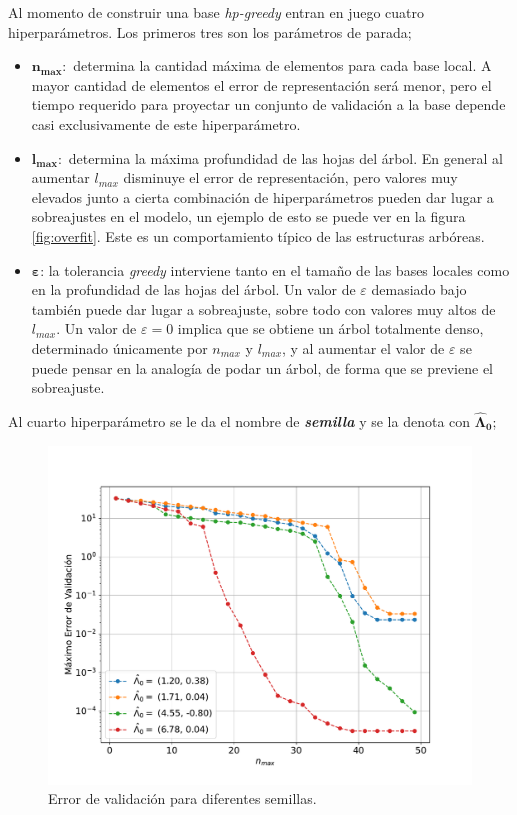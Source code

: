 Al momento de construir una base \textit{hp-greedy} entran en juego cuatro hiperparámetros. Los primeros tres son los parámetros de parada;
\begin{itemize}
\item $\bm{n_{max}}:$ determina la cantidad máxima de elementos para cada base local. A mayor cantidad de elementos el error de representación será menor, pero el tiempo requerido para proyectar un conjunto de validación a la base depende casi exclusivamente de este hiperparámetro.
\item $\bm{l_{max}}:$ determina la máxima profundidad de las hojas del árbol. En general al aumentar $l_{max}$ disminuye el error de representación, pero valores muy elevados junto a cierta combinación de hiperparámetros pueden dar lugar a sobreajustes en el modelo, un ejemplo de esto se puede ver en la figura \ref{fig:overfit}. Este es un comportamiento típico de las estructuras arbóreas.
\item $\bm{\varepsilon}$: la tolerancia \textit{greedy} interviene tanto en el tamaño de las bases locales como en la profundidad de las hojas del árbol. Un valor de $\varepsilon$ demasiado bajo también puede dar lugar a sobreajuste, sobre todo con valores muy altos de $l_{max}$. Un valor de $\varepsilon = 0$ implica que se obtiene un árbol totalmente denso, determinado únicamente por $n_{max}$ y $l_{max}$, y al aumentar el valor de $\varepsilon$ se puede pensar en la analogía de podar un árbol, de forma que se previene el sobreajuste.
\end{itemize}

Al cuarto hiperparámetro se le da el nombre de \textit{\textbf{semilla}} y se la denota con $\bm{\hat{\Lambda}_0}$;

\begin{figure}[h!]
\centering
\includegraphics[width=.8\columnwidth ,trim={1.1cm, 1.1cm, 1.2cm, 1.2cm}]{figs/Semillas_v_nmax_2D.pdf}
\caption{Error de validación para diferentes semillas.}
\label{fig:seeds0}
\end{figure}

